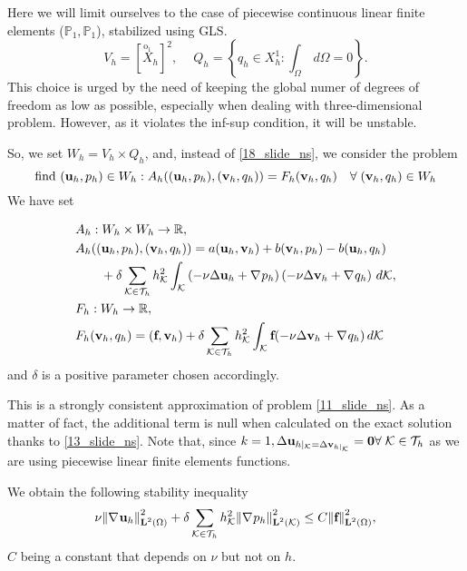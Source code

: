 Here we will limit ourselves to the case of piecewise continuous linear finite elements (\(\mathbb{P}_1, \mathbb{P}_1\)), stabilized using GLS.
\[
    V_h = [\overset{\mathrm{o}_1}{X}_h]^2, \ \quad Q_h = \left\{ q_h \in X_h^1 : \int_\Omega \, d\Omega = 0 \right\}.
\]
This choice is urged by the need of keeping the global numer of degrees of freedom as low as possible, especially when dealing with three-dimensional problem. However, as it violates the inf-sup condition, it will be unstable.

So, we set \(W_h = V_h \times Q_h\), and, instead of \eqref{18_slide_ns}, we consider the problem 
\begin{equation}
    \text{find } (\textbf{u}_h, p_h) \in W_h : A_h ((\textbf{u}_h, p_h), (\textbf{v}_h, q_h)) = F_h (\textbf{v}_h, q_h) \quad \forall \; (\textbf{v}_h, q_h) \in W_h 
    \label{53_slide_ns}
\end{equation}
We have set 

\begin{align*}
    &A_h : W_h \times W_h \to \mathbb{R}, \\
    &A_h((\textbf{u}_h, p_h), (\textbf{v}_h, q_h)) = a(\textbf{u}_h, \textbf{v}_h) + b(\textbf{v}_h, p_h) - b(\textbf{u}_h, q_h) \\
    &\qquad + \delta \sum_{{\mathcal{K}\in\mathcal{T}_h}} h_{\mathcal{K}}^2 \int_{\mathcal{K}} \left( -\nu\Delta \textbf{u}_h + \nabla\mspace{1mu} p_h \right)\left( -\nu \Delta \textbf{v}_h + \nabla\mspace{1mu} q_h \right) \, d\mathcal{K}, \\
    &F_h : W_h \to \mathbb{R}, \\
    &F_h(\textbf{v}_h, q_h) = (\textbf{f},\textbf{v}_h) + \delta \sum_{\mathcal{K}\in\mathcal{T}_h} h^2_{\mathcal{K}} \int_{\mathcal{K}} \textbf{f}(-\nu\Delta \textbf{v}_h + \nabla\mspace{1mu} q_h) \, d\mathcal{K}
\end{align*}
and \(\delta\) is a positive parameter chosen accordingly.

This is a strongly consistent approximation of problem \eqref{11_slide_ns}. As a matter of fact, the additional term is null when calculated on the exact solution thanks to \eqref{13_slide_ns}. Note that, since \(k=1, \Delta \textbf{u}_{h\vert_{\mathcal{K}} = \Delta \textbf{v}_{h\vert_{\mathcal{K}}}} = \textbf{0} \forall \; {\mathcal{K}\in\mathcal{T}_h}\) as we are using piecewise linear finite elements functions.

We obtain the following stability inequality 
\begin{equation}
    \nu \norm{\nabla\mspace{1mu}\textbf{u}_h}_{\textbf{L}^2(\Omega)}^2 + \delta \sum_{\mathcal{K}\in\mathcal{T}_h} h^2_{\mathcal{K}} \norm{\nabla\mspace{1mu} p_h}^2_{\textbf{L}^2 (\mathcal{K})} \leq C \norm{\textbf{f}}^2_{\textbf{L}^2(\Omega)},
    \label{55_slide_ns}
\end{equation}
\(C\) being a constant that depends on \(\nu\) but not on \(h\). 

